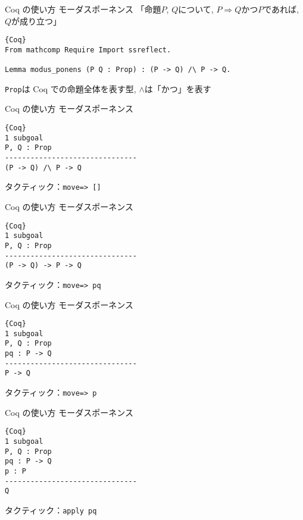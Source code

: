 \documentclass[dvipdfmx,cjk]{beamer}
\theoremstyle{mystyle}
\newcommand{\Lra}{\Longrightarrow}
\newcommand{\0}{\textbf{0}}
\begin{document}
\begin{frame}[fragile]{Coq の使い方 モーダスポーネンス}
	「命題$P$, $Q$について, $P \Lra Q$かつ$P$であれば, $Q$が成り立つ」 \pause
	\begin{lstlisting}{Coq}
From mathcomp Require Import ssreflect.

Lemma modus_ponens (P Q : Prop) : (P -> Q) /\ P -> Q. \end{lstlisting} \pause
	{\tt Prop}は Coq での命題全体を表す型, $\wedge$は「かつ」を表す
\end{frame}

\begin{frame}[fragile]{Coq の使い方 モーダスポーネンス}
	\begin{screen}
	  \begin{lstlisting}{Coq}
1 subgoal
P, Q : Prop
-------------------------------
(P -> Q) /\ P -> Q \end{lstlisting}
	\end{screen} \pause
	タクティック：{\tt move=> []}
\end{frame}

\begin{frame}[fragile]{Coq の使い方 モーダスポーネンス}
	\begin{screen}
	  \begin{lstlisting}{Coq}
1 subgoal
P, Q : Prop
-------------------------------
(P -> Q) -> P -> Q \end{lstlisting}
	\end{screen} \pause
	タクティック：{\tt move=> pq}
\end{frame}

\begin{frame}[fragile]{Coq の使い方 モーダスポーネンス}
	\begin{screen}
	  \begin{lstlisting}{Coq}
1 subgoal
P, Q : Prop
pq : P -> Q
-------------------------------
P -> Q \end{lstlisting}
	\end{screen} \pause
	タクティック：{\tt move=> p}
\end{frame}

\begin{frame}[fragile]{Coq の使い方 モーダスポーネンス}
	\begin{screen}
	  \begin{lstlisting}{Coq}
1 subgoal
P, Q : Prop
pq : P -> Q
p : P
-------------------------------
Q \end{lstlisting}
	\end{screen} \pause
	タクティック：{\tt apply pq}
\end{frame}
\end{document}
